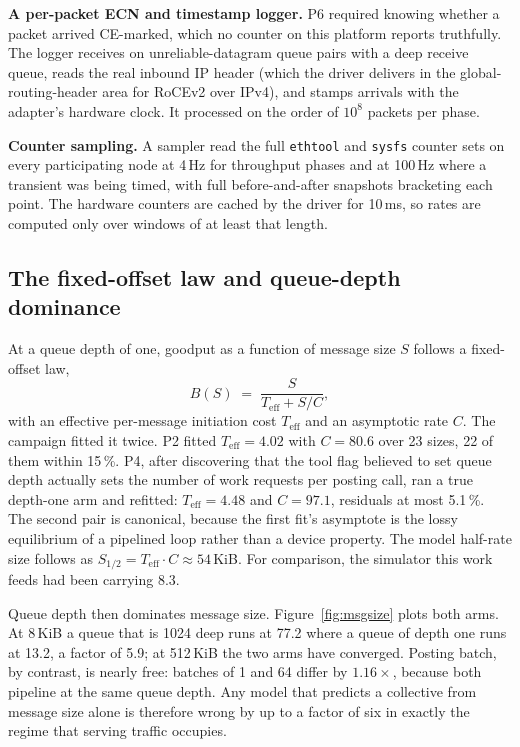\textbf{A per-packet ECN and timestamp logger.} P6 required knowing whether a
packet arrived CE-marked, which no counter on this platform reports
truthfully. The logger receives on unreliable-datagram queue pairs with a deep
receive queue, reads the real inbound IP header (which the driver delivers in
the global-routing-header area for RoCEv2 over IPv4), and stamps arrivals with
the adapter's hardware clock. It processed on the order of $10^{8}$ packets per
phase.

\textbf{Counter sampling.} A sampler read the full \texttt{ethtool} and
\texttt{sysfs} counter sets on every participating node at 4\,Hz for
throughput phases and at 100\,Hz where a transient was being timed, with full
before-and-after snapshots bracketing each point. The hardware counters are
cached by the driver for 10\,ms, so rates are computed only over windows of at
least that length.

\subsection{The fixed-offset law and queue-depth dominance}
\label{sec:meas:law}

At a queue depth of one, goodput as a function of message size $S$ follows a
fixed-offset law,
\begin{equation}
  B(S) \;=\; \frac{S}{T_{\text{eff}} + S/C},
  \label{eq:fixedoffset}
\end{equation}
with an effective per-message initiation cost $T_{\text{eff}}$ and an
asymptotic rate $C$. The campaign fitted it twice. P2 fitted
$T_{\text{eff}} = 4.02$\uS{} with $C = 80.6$\Gbps{} over 23 sizes, 22 of them
within 15\,\%. P4, after discovering that the tool flag believed to set queue
depth actually sets the number of work requests per posting call, ran a true
depth-one arm and refitted: $T_{\text{eff}} = 4.48$\uS{} and
$C = 97.1$\Gbps{}, residuals at most 5.1\,\%. The second pair is canonical,
because the first fit's asymptote is the lossy equilibrium of a pipelined loop
rather than a device property. The model half-rate size follows as
$S_{1/2} = T_{\text{eff}} \cdot C \approx 54$\,KiB. For comparison, the
simulator this work feeds had been carrying $8.3$\uS{}.

Queue depth then dominates message size. Figure~\ref{fig:msgsize} plots both
arms. At 8\,KiB a queue that is 1024 deep runs at 77.2\Gbps{} where a queue of
depth one runs at 13.2\Gbps{}, a factor of 5.9; at 512\,KiB the two arms have
converged. Posting batch, by contrast, is nearly free: batches of 1 and 64
differ by $1.16\times$, because both pipeline at the same queue depth. Any
model that predicts a collective from message size alone is therefore wrong by
up to a factor of six in exactly the regime that serving traffic occupies.

